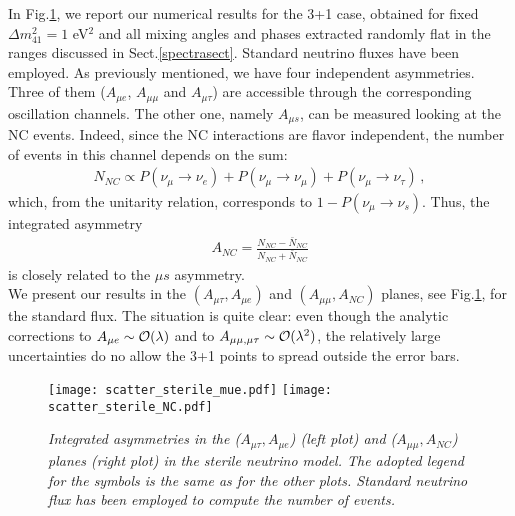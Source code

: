 \documentclass[12pt]{article}
\begin{document}
In Fig.\ref{31scatter}, we report our numerical results for the 3+1 case, obtained for fixed $\Delta m_{41}^2=1$ eV$^2$ and all mixing angles and phases extracted randomly flat in the ranges discussed in Sect.\ref{spectrasect}. Standard neutrino fluxes have been employed.
As previously mentioned, we have four independent asymmetries. Three of them ($A_{\mu e}$, $A_{\mu\mu}$ and $A_{\mu\tau}$) are accessible through the corresponding oscillation channels. The other one, namely $A_{\mu s}$, can be measured looking at the NC events. Indeed, since the NC interactions are flavor independent, the number of events in this channel depends on the sum: 
\begin{eqnarray}
 N_{NC}\propto P(\nu_\mu\to\nu_e)+P(\nu_\mu\to\nu_\mu)+P(\nu_\mu\to\nu_\tau)\,,
\end{eqnarray}
which, from the unitarity relation, corresponds to $1-P(\nu_\mu\to\nu_s)$. Thus, the integrated asymmetry
\begin{eqnarray}
 A_{NC}=\frac{N_{NC}-\bar{N}_{NC}}{N_{NC}+\bar{N}_{NC}}
\end{eqnarray}
is closely related to the $\mu s$ asymmetry. \\
We present our results in the $(A_{\mu \tau},A_{\mu e})$ and $(A_{\mu\mu},A_{NC})$ planes, see Fig.\ref{31scatter}, for the standard flux. The situation is quite clear: even though the analytic corrections to $A_{\mu e}\sim {\cal O}(\lambda)$ and to $A_{\mu \mu, \mu\tau}\sim {\cal O}(\lambda^2)$,
the relatively large uncertainties do no allow the 3+1 points to spread outside the error bars. 

\begin{figure}
    \centering
    \texttt{[image: scatter\_sterile\_mue.pdf]}
    \texttt{[image: scatter\_sterile\_NC.pdf]}
    \caption{\it Integrated asymmetries in the ($A_{\mu\tau}, A_{\mu e}$) (left plot) and ($A_{\mu\mu}, A_{NC}$) planes (right plot) in the sterile neutrino model. The adopted legend for the symbols is the same as for the other plots. Standard neutrino flux has been employed to compute the number of events.}
    \label{31scatter}
\end{figure}
\end{document}
